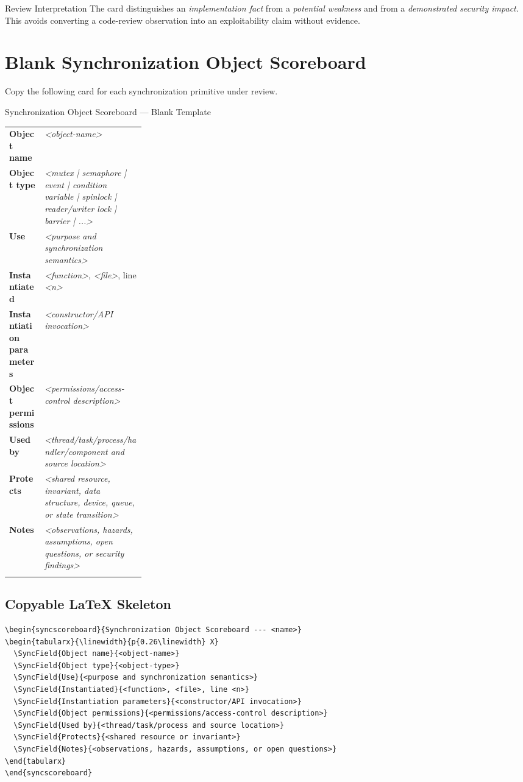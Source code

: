 \documentclass[11pt]{article}
\newcommand{\placeholder}[1]{\textit{\textless #1\textgreater}}
\newcommand{\SyncField}[2]{#1 & #2 \\\addlinespace[0.15em]}
\begin{document}
\begin{guidancebox}{Review Interpretation}
The card distinguishes an \emph{implementation fact} from a \emph{potential weakness} and from a \emph{demonstrated security impact}. This avoids converting a code-review observation into an exploitability claim without evidence.
\end{guidancebox}

\section{Blank Synchronization Object Scoreboard}

Copy the following card for each synchronization primitive under review.

\begin{syncscoreboard}{Synchronization Object Scoreboard --- Blank Template}
\renewcommand{\arraystretch}{1.22}
\begin{tabularx}{\linewidth}{>{\bfseries\RaggedRight\arraybackslash}p{0.26\linewidth} >{\RaggedRight\arraybackslash}X}
  \SyncField{Object name}{\placeholder{object-name}}
  \SyncField{Object type}{\placeholder{mutex | semaphore | event | condition variable | spinlock | reader/writer lock | barrier | ...}}
  \SyncField{Use}{\placeholder{purpose and synchronization semantics}}
  \SyncField{Instantiated}{\placeholder{function}, \placeholder{file}, line \placeholder{n}}
  \SyncField{Instantiation parameters}{\placeholder{constructor/API invocation}}
  \SyncField{Object permissions}{\placeholder{permissions/access-control description}}
  \SyncField{Used by}{\placeholder{thread/task/process/handler/component and source location}}
  \SyncField{Protects}{\placeholder{shared resource, invariant, data structure, device, queue, or state transition}}
  \SyncField{Notes}{\placeholder{observations, hazards, assumptions, open questions, or security findings}}
\end{tabularx}
\end{syncscoreboard}

\subsection*{Copyable LaTeX Skeleton}

\begin{verbatim}
\begin{syncscoreboard}{Synchronization Object Scoreboard --- <name>}
\begin{tabularx}{\linewidth}{p{0.26\linewidth} X}
  \SyncField{Object name}{<object-name>}
  \SyncField{Object type}{<object-type>}
  \SyncField{Use}{<purpose and synchronization semantics>}
  \SyncField{Instantiated}{<function>, <file>, line <n>}
  \SyncField{Instantiation parameters}{<constructor/API invocation>}
  \SyncField{Object permissions}{<permissions/access-control description>}
  \SyncField{Used by}{<thread/task/process and source location>}
  \SyncField{Protects}{<shared resource or invariant>}
  \SyncField{Notes}{<observations, hazards, assumptions, or open questions>}
\end{tabularx}
\end{syncscoreboard}
\end{verbatim}
\end{document}
